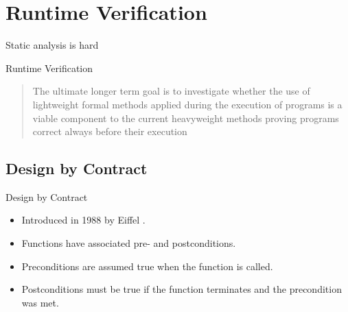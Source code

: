 \documentclass[12pt]{beamer}
\begin{document}

\section{Runtime Verification}
\label{sec:runver}

\begin{frame}
  \begin{center}
    \Large Static analysis is hard

  \end{center}
\end{frame}

\begin{frame}{Runtime Verification}

  \begin{quote}
    The ultimate longer term goal is to investigate whether the use of
    lightweight formal methods applied during the execution of
    programs is a viable component to the current heavyweight methods
    proving programs correct always before their execution

  \end{quote}
\end{frame}


\subsection{Design by Contract}
\label{sec:runver-dbc}

\begin{frame}{Design by Contract}

  \begin{itemize}
    \item Introduced in 1988 by Eiffel \parencite{eiffel}.
    \item Functions have associated pre- and postconditions.
    \item Preconditions are assumed true when the function is called.
    \item Postconditions must be true if the function terminates
      and the precondition was met.
  \end{itemize}

\end{frame}
\end{document}

